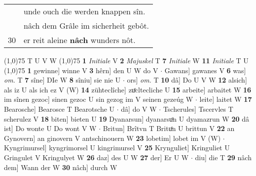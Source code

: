 \documentclass[8pt,a4paper,notitlepage]{article}
\begin{document}
\begin{table}[ht]
\begin{minipage}[t]{0.5\linewidth}
\begin{tabular}{rl}
 & unde ouch die werden knappen sîn.\\ 
 & nâch dem Grâle im sicherheit gebôt.\\ 
30 & er reit aleine \textbf{nâch} wunders nôt.\\ 
\end{tabular}
\scriptsize
\line(1,0){75} \newline
T U V W \newline
\line(1,0){75} \newline
\textbf{1} \textit{Initiale} V  \textbf{2} \textit{Majuskel} T  \textbf{7} \textit{Initiale} W  \textbf{11} \textit{Initiale} T U  \newline
\line(1,0){75} \newline
\textbf{1} gewinne] winne V \textbf{3} hêrn] den U W do V  $\cdot$ Gawans] gawanes V \textbf{6} was] \textit{om.} T \textbf{7} sîne] DIe W \textbf{8} sîniu] sie nie U  $\cdot$ ors] \textit{om.} T \textbf{10} dâ] Do U V W \textbf{12} alsich] als iz U als ich ez V (W) \textbf{14} zühteclîche] zuͦcltecliche U \textbf{15} arbeite] arbaitet W \textbf{16} im sînen gezoc] sinen gezoc U sin gezog im V seinen gezeúg W  $\cdot$ leite] laitet W \textbf{17} Bearosche] Bearosce T Bearotsche U  $\cdot$ dâ] do V W  $\cdot$ Tscherules] Tscervles T scherulez V \textbf{18} biten] bieten U \textbf{19} Dyanarsun] dyanarsuͦn U dyamazrun W \textbf{20} dâ ist] Do wonte U Do wont V W  $\cdot$ Britun] Brîtvn T Brituͦn U brittun V \textbf{22} an Gynovern] an ginovern V antschinouern W \textbf{23} lobetim] lobet im V (W)  $\cdot$ Kyngrimursel] kyngrimorsel U kingrimursel V \textbf{25} Krynguliet] Kringuliet U Gringulet V Kringulyet W \textbf{26} daz] des U W \textbf{27} der] Er U W  $\cdot$ diu] die T \textbf{29} nâch dem] Wann der W \textbf{30} nâch] durch W \newline
\end{minipage}
\end{table}
\end{document}

